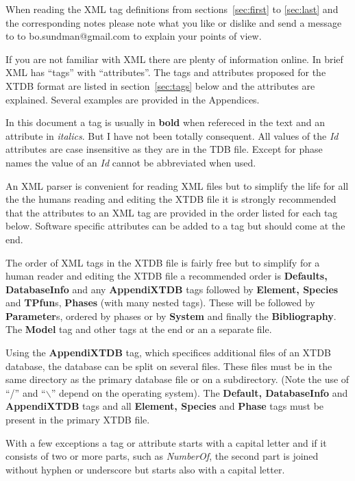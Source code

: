 \documentclass{article}
\begin{document}
When reading the XML tag definitions from sections~\ref{sec:first} to
\ref{sec:last} and the corresponding notes please note what you like
or dislike and send a message to to bo.sundman@gmail.com to explain
your points of view.

If you are not familiar with XML there are plenty of information
online.  In brief XML has ``tags'' with ``attributes''.  The tags and
attributes proposed for the XTDB format are listed in
section~\ref{sec:tags} below and the attributes are explained.
Several examples are provided in the Appendices.

In this document a tag is usually in {\bf bold} when refereced in the
text and an attribute in {\em italics}.  But I have not been totally
consequent.  All values of the {\em Id} attributes are case
insensitive as they are in the TDB file.  Except for phase names the
value of an {\em Id} cannot be abbreviated when used.

An XML parser is convenient for reading XML files but to simplify the
life for all the the humans reading and editing the XTDB file it is
strongly recommended that the attributes to an XML tag are provided in
the order listed for each tag below.  Software specific attributes can
be added to a tag but should come at the end.

The order of XML tags in the XTDB file is fairly free but to simplify
for a human reader and editing the XTDB file a recommended order is
{\bf Defaults, DatabaseInfo} and any {\bf AppendiXTDB} tags followed
by {\bf Element, Species} and {\bf TPfun}s, {\bf Phases} (with many
nested tags).  These will be followed by {\bf Parameter}s, ordered by
phases or by {\bf System} and finally the {\bf Bibliography}.  The
{\bf Model} tag and other tags at the end or an a separate file.

Using the {\bf AppendiXTDB} tag, which specifices additional files of
an XTDB database, the database can be split on several files.  These
files must be in the same directory as the primary database file or on
a subdirectory.  (Note the use of ``/'' and ``$\backslash$'' depend on
the operating system).  The {\bf Default, DatabaseInfo} and {\bf
  AppendiXTDB} tags and all {\bf Element, Species} and {\bf Phase}
tags must be present in the primary XTDB file.

With a few exceptions a tag or attribute starts with a capital letter
and if it consists of two or more parts, such as {\em NumberOf}, the
second part is joined without hyphen or underscore but starts also
with a capital letter.
\end{document}
